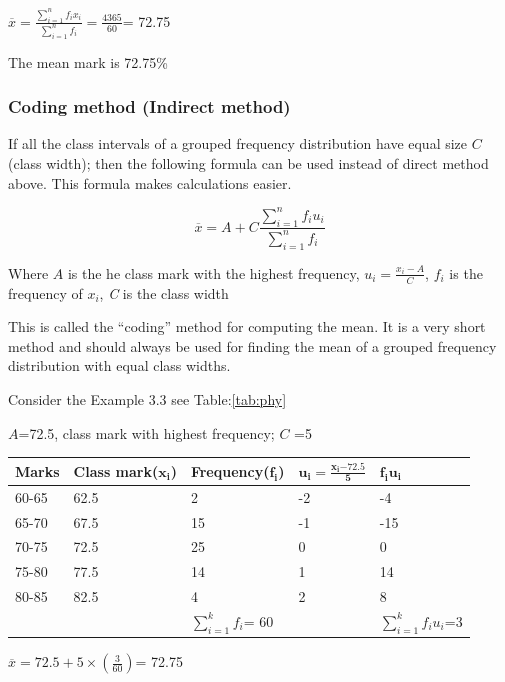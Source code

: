 \documentclass[
]{book}
\begin{document}
\(\overline{x} = \frac{\sum_{i = 1}^{n}{f_{i}x_{i}}}{\sum_{i = 1}^{n}f_{i}} = \frac{4365}{60}\)=
72.75

The mean mark is 72.75\%

\hypertarget{coding-method-indirect-method}{%
\subsubsection{Coding method (Indirect method)}\label{coding-method-indirect-method}}

If all the class intervals of a grouped frequency distribution have equal size \(C\) (class width); then the following formula can be used instead of direct method above. This formula makes calculations easier.

\[\overline{x} = A + C\frac{\sum_{i = 1}^{n}{f_{i}u_{i}}}{\sum_{i = 1}^{n}f_{i}}\]

Where \(A\) is the he class mark with the highest frequency,
\(u_{i} = \frac{x_{i} - A}{C}\), \(f_{i}\) is the frequency of \(x_{i}\), \emph{C}
is the class width

This is called the ``coding'' method for computing the mean. It is a very short method and should always be used for finding the mean of a grouped frequency distribution with equal class widths.

Consider the Example 3.3 see Table:\ref{tab:phy}

\(A\)=72.5, class mark with highest frequency; \(C\) =5

\begin{longtable}[]{@{}lllll@{}}
\toprule
Marks & Class mark(\(\mathbf{x}_{\mathbf{i}}\)) & Frequency(\(\mathbf{f}_{\mathbf{i}}\)) & \(\mathbf{u}_{\mathbf{i}}\mathbf{=}\frac{\mathbf{x}_{\mathbf{i}}\mathbf{- 72.5}}{\mathbf{5}}\) & \(\mathbf{f}_{\mathbf{i}}\mathbf{u}_{\mathbf{i}}\) \\
\midrule
\endhead
60-65 & 62.5 & 2 & -2 & -4 \\
65-70 & 67.5 & 15 & -1 & -15 \\
70-75 & 72.5 & 25 & 0 & 0 \\
75-80 & 77.5 & 14 & 1 & 14 \\
80-85 & 82.5 & 4 & 2 & 8 \\
& & \(\sum_{i = 1}^{k}f_{i}\)= 60 & & \(\sum_{i = 1}^{k}{f_{i}u_{i}}\)=3 \\
\bottomrule
\end{longtable}

\(\overline{x} = 72.5 + 5 \times \left( \frac{3}{60} \right)\)= 72.75
\end{document}

